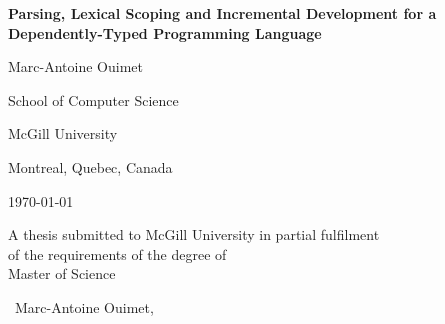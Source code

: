 \begin{titlepage}
\centering

\vspace*{0.5cm}

{\bfseries\LARGE Parsing, Lexical Scoping and Incremental Development for a Dependently-Typed Programming Language}

\vspace{1.8cm}

{\large Marc-Antoine Ouimet}

\vspace{2cm}

School of Computer Science

McGill University

Montreal, Quebec, Canada

\vspace{1.5cm}

\monthyeardate\today

\vspace{2cm}

A thesis submitted to McGill University in partial fulfilment\\
of the requirements of the degree of\\
Master of Science

\vfill

\raisebox{0.25ex}{\scalebox{0.8}{\textcopyright}}\ Marc-Antoine Ouimet, \the\year
\end{titlepage}
